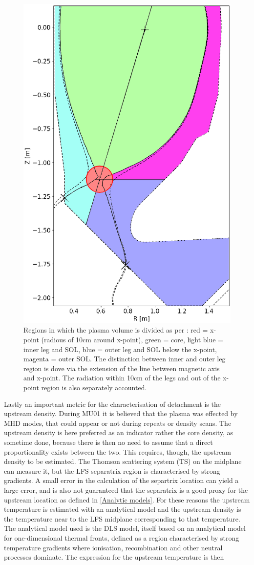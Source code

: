 \begin{figure}
	\centering
	\includegraphics[trim={0 0 0 0},clip,width=0.4\linewidth]{Chapters/chapter2/figs/IRVB_regions_divided.png}
	\caption{Regions in which the plasma volume is divided as per \cite{Harrison2011}: red = x-point (radious of 10cm around x-point), green = core, light blue = inner leg and SOL, blue = outer leg and SOL below the x-point, magenta = outer SOL. The distinction between inner and outer leg region is dove via the extension of the line between magnetic axis and x-point. The radiation within 10cm of the legs and out of the x-point region is also separately accounted.}
	\label{fig:IRVB_regions_divided}
\end{figure}

Lastly an important metric for the characterisation of detachment is the upstream density. During MU01 it is believed that the plasma was effected by MHD modes, that could appear or not during repeats or density scans. The upstream density is here preferred as an indicator rather the core density, as sometime done, because there is then no need to assume that a direct proportionality exists between the two. This requires, though, the upstream density to be estimated. The Thomson scattering system (TS) on the midplane can measure it, but the LFS separatrix region is characterised by strong gradients. A small error in the calculation of the separtrix location can yield a large error, and is also not guaranteed that the separatrix is a good proxy for the upstream location as defined in \autoref{Analytic models}. For these reasons the upstream temperature is estimated with an analytical model and the upstream density is the temperature near to the LFS midplane corresponding to that temperature. The analytical model used is the DLS model\cite{Lipschultz2016}, itself based on an analytical model for one-dimensional thermal fronts, defined as a region characterised by strong temperature gradients where ionisation, recombination and other neutral processes dominate.\cite{Hutchinson1994} The expression for the upstream temperature is then

